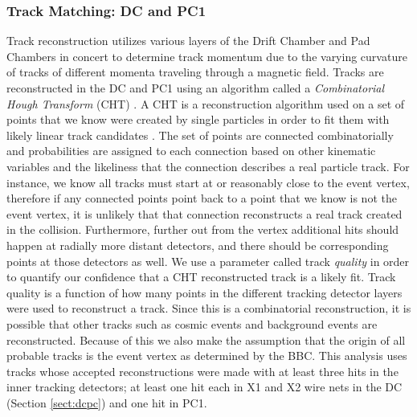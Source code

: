 \subsubsection{Track Matching: DC and PC1}
Track reconstruction utilizes various layers of the Drift Chamber and Pad Chambers in concert to determine track momentum due to the varying curvature of tracks of different momenta traveling through a magnetic field. Tracks are reconstructed in the DC and PC1 using an algorithm called a \textit{Combinatorial Hough Transform} (CHT) \citep{Mitchell:2002wu}. A CHT is a reconstruction algorithm used on a set of points that we know were created by single particles in order to fit them with likely linear track candidates \citep{OHLSSON199277}. The set of points are connected combinatorially and probabilities are assigned to each connection based on other kinematic variables and the likeliness that the connection describes a real particle track. For instance, we know all tracks must start at or reasonably close to the event vertex, therefore if any connected points point back to a point that we know is not the event vertex, it is unlikely that that connection reconstructs a real track created in the collision. Furthermore, further out from the vertex additional hits should happen at radially more distant detectors, and there should be corresponding points at those detectors as well.  We use a parameter called track \textit{quality} in order to quantify our confidence that a CHT reconstructed track is a likely fit. Track quality is a function of how many points in the different tracking detector layers were used to reconstruct a track. Since this is a combinatorial reconstruction, it is possible that other tracks such as cosmic events and background events are reconstructed.  Because of this we also make the assumption that the origin of all probable tracks is the event vertex as determined by the BBC. This analysis uses tracks whose accepted reconstructions were made with at least three hits in the inner tracking detectors; at least one hit each in X1 and X2 wire nets in the DC (Section \ref{sect:dcpc}) and one hit in PC1.

